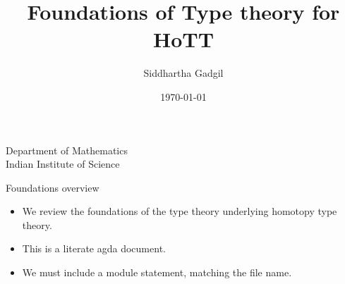 \documentclass[10 pt., handout]{beamer}
\theoremstyle{plain}
\theoremstyle{remark}
\begin{document}
\title{Foundations of Type theory for HoTT}

\author{Siddhartha Gadgil}


\institute
{
Department of Mathematics\\
  Indian Institute of Science}
  
\date{\today}

\maketitle








 



\beamerdefaultoverlayspecification{<+->}
\begin{frame}{Foundations overview}
\begin{itemize}

\item We review the foundations of the type theory underlying homotopy type theory. 

\item This is a literate agda document.

\item We must include a module statement, matching the file name.

\begin{code}\>\<%
\\
\>  \<%
\\
%
\\
\>  \<%
\\
%
\\
\>\<\end{code}

\end{itemize}

\end{frame}
\end{document}
